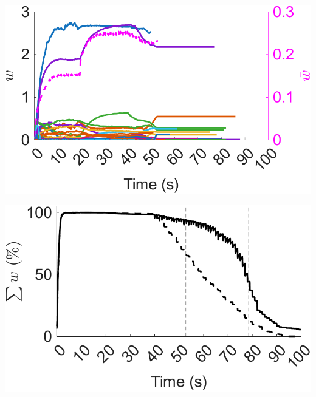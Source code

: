 \documentclass[utf8]{FrontiersinHarvard} %
\begin{document}
\begin{subfigure}
\begin{minipage}[b]{0.32\textwidth}
        \caption{}
        \label{figs:results:AD:Hz_no_resources}
    \end{minipage}%
\setcounter{figure}{4}
\setcounter{subfigure}{6}
    \begin{minipage}[b]{0.32\textwidth}
        \includegraphics[width=\linewidth]{AD/weights_E2E_traces_no_resources}
        \caption{}
        \label{figs:results:AD:weights_traces_no_resources}
    \end{minipage}%
\setcounter{figure}{4}
\setcounter{subfigure}{7}
    \begin{minipage}[b]{0.32\textwidth}
        \includegraphics[width=\linewidth]{AD/weights_E2E_sum}
        \caption{}
        \label{figs:results:AD:weights_sums}
    \end{minipage}%
\setcounter{figure}{4}
\setcounter{subfigure}{8}
    \begin{minipage}[b]{0.32\textwidth}

\end{minipage}
\end{subfigure}
\end{document}
